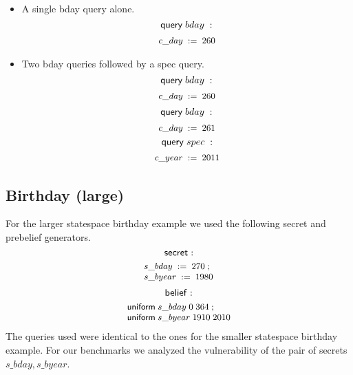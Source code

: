 \begin{itemize}
\item{} A single bday query alone.
$$ \mathsf{query} \; bday \; : $$
\begin{displaymath}{\small
\begin{array}{l}
  {c\text{\_}day}\;:=\;{260}\\
\end{array}
}\end{displaymath}

\item{} Two bday queries followed by a spec query.
$$ \mathsf{query} \; bday \; : $$
\begin{displaymath}{\small
\begin{array}{l}
  {c\text{\_}day}\;:=\;{260}\\
\end{array}
}\end{displaymath}
$$ \mathsf{query} \; bday \; : $$
\begin{displaymath}{\small
\begin{array}{l}
  {c\text{\_}day}\;:=\;{261}\\
\end{array}
}\end{displaymath}
$$ \mathsf{query} \; spec \; : $$
\begin{displaymath}{\small
\begin{array}{l}
  {c\text{\_}year}\;:=\;{2011}\\
\end{array}
}\end{displaymath}

\end{itemize}

\subsection{Birthday (large)}

For the larger statespace birthday example we used the following
secret and prebelief generators.
$$ \mathsf{secret}: $$
\begin{displaymath}{\small
\begin{array}{l}
  {s\text{\_}bday}\;:=\;{270}\; ;\\
  {s\text{\_}byear}\;:=\;{1980}\\
\end{array}
}\end{displaymath}
$$ \mathsf{belief}: $$
\begin{displaymath}{\small
\begin{array}{l}
  \mathsf{uniform}\;{s\text{\_}bday}\;{0}\;364\; ;\\
  \mathsf{uniform}\;{s\text{\_}byear}\;{1910}\;2010\\
\end{array}
}\end{displaymath} The queries used were identical to the ones for the
smaller statespace birthday example. For our benchmarks we analyzed
the vulnerability of the pair of secrets $ s\text{\_}bday,
s\text{\_}byear $.


